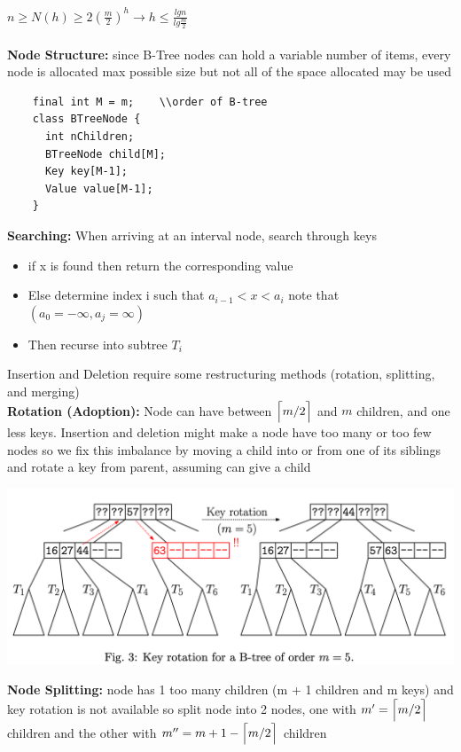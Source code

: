 \documentclass{article}
\DeclarePairedDelimiter{\ceil}{\lceil}{\rceil}
\begin{document}
  \indent $n \geq N(h) \geq 2(\frac{m}{2})^{h} \rightarrow h \leq \frac{lgn}{lg\frac{m}{2}}$\\ \\
  \textbf{Node Structure: }since B-Tree nodes can hold a variable number of items, every node is allocated max possible size but not all of the space allocated may be used
  \begin{lstlisting}
    final int M = m;    \\order of B-tree
    class BTreeNode {
      int nChildren;
      BTreeNode child[M];
      Key key[M-1];
      Value value[M-1]; 
    }
  \end{lstlisting}
  \textbf{Searching: }When arriving at an interval node, search through keys
  \begin{itemize}[noitemsep]
  \item if x is found then return the corresponding value
  \item Else determine index i such that $a_{i-1} < x < a_{i}$ note that $(a_{0} = -\infty, a_{j} = \infty)$
  \item Then recurse into subtree $T_{i}$\\
  \end{itemize}
  Insertion and Deletion require some restructuring methods (rotation, splitting, and merging)\\
  \textbf{Rotation (Adoption): }Node can have between $\ceil[\Big]{m/2}$ and $m$ children, and one less keys. Insertion and deletion might make a node have too many or too few nodes so we fix this imbalance by moving a child into or from one of its siblings and rotate a key from parent, assuming can give a child\\
  \begin{center}
  \includegraphics[scale=0.10]{BTreeRotations}
  \end{center}
  \textbf{Node Splitting: }node has 1 too many children (m + 1 children and m keys) and key rotation is not available so split node into 2 nodes, one with $m' = \ceil[\Big]{m/2}$ children and the other with $m''= m + 1 - \ceil[\Big]{m/2}$ children\\
\end{document}
